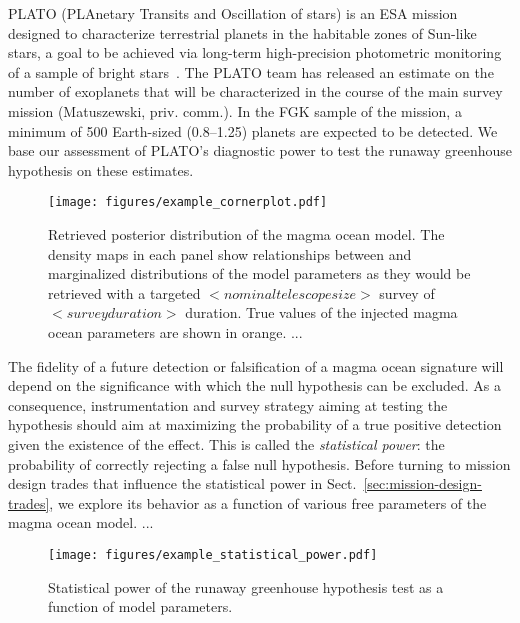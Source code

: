 \documentclass[modern]{aastex631}
\begin{document}
PLATO (PLAnetary Transits and Oscillation of stars) is an ESA mission designed to characterize terrestrial planets in the habitable zones of Sun-like stars, a goal to be achieved via long-term high-precision photometric monitoring of a sample of bright stars~\citep{Rauer2016}.
The PLATO team has released an estimate on the number of exoplanets that will be characterized in the course of the main survey mission (Matuszewski, priv. comm.).
In the FGK sample of the mission, a minimum of 500 Earth-sized (\SIrange{0.8}{1.25}{\rEarth}) planets are expected to be detected.
We base our assessment of PLATO's diagnostic power to test the runaway greenhouse hypothesis on these estimates.

\begin{figure}[ht!]
    \begin{centering}
        \texttt{[image: figures/example\_cornerplot.pdf]}
        \caption{
        Retrieved posterior distribution of the magma ocean model. The density maps in each panel show relationships between and marginalized distributions of the model parameters as they would be retrieved with a targeted $<nominal telescope size>$ survey of $<survey duration>$ duration. True values of the injected magma ocean parameters are shown in orange. ...
        }
        \label{fig:cornerplot}
    \end{centering}
\end{figure}



\begin{note}
   The fidelity of a future detection or falsification of a magma ocean signature will depend on the significance with which the null hypothesis can be excluded.
   As a consequence, instrumentation and survey strategy aiming at testing the hypothesis should aim at maximizing the probability of a true positive detection given the existence of the effect.
   This is called the \textit{statistical power}: the probability of correctly rejecting a false null hypothesis.
   Before turning to mission design trades that influence the statistical power in Sect.~\ref{sec:mission-design-trades}, we explore its behavior as a function of various free parameters of the magma ocean model.
    ...
\begin{figure*}[ht!]
    \begin{centering}
        \texttt{[image: figures/example\_statistical\_power.pdf]}
        \caption{
        Statistical power of the runaway greenhouse hypothesis test as a function of model parameters.
        }
        \label{fig:statistical_power}
    \end{centering}
\end{figure*}

\end{note}
\end{document}
